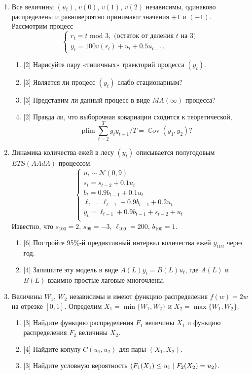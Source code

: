 \documentclass[12pt]{article}
\DeclareMathOperator{\Cov}{\mathbb{C}ov}
\let\P\relax
\DeclareMathOperator{\P}{\mathbb{P}}
\DeclareMathOperator{\plim}{plim}
\newcommand{\cN}{\mathcal{N}}
\begin{document}
\begin{enumerate}
    \item Все величины $(u_t)$, $v(0)$, $v(1)$, $v(2)$ независимы, одинаково распределены и равновероятно принимают значения $+1$ и $(-1)$.
    Рассмотрим процесс 
    \[
    \begin{cases} 
        r_t = t \text{ mod } 3, \text{ (остаток от деления }t \text{ на 3)} \\
        y_t = 100 v(r_t) + u_t + 0.5u_{t-1}.   
    \end{cases}
    \]
    \begin{enumerate}
        \item {[2]} Нарисуйте пару «типичных» траекторий процесса $(y_t)$. 
        \item {[3]} Является ли процесс $(y_t)$ слабо стационарным?
        \item {[3]} Представим ли данный процесс в виде $MA(\infty)$ процесса?
        \item {[2]} Правда ли, что выборочная ковариации сходится к теоретической,
        \[
        \plim \sum_{t=2}^T y_t y_{t-1} / T = \Cov(y_1, y_2)?
        \]
    \end{enumerate}

    \item Динамика количества ежей в лесу $(y_t)$ описывается полугодовым $ETS(AAdA)$ процессом:
    \[
    \begin{cases}
        u_t \sim \cN(0, 9) \\
        s_t = s_{t-2} + 0.1 u_t \\
        b_t = 0.9b_{t-1} + 0.1 u_t \\
        \ell_t = \ell_{t-1} + 0.9b_{t-1} + 0.2 u_t \\
        y_t = \ell_{t-1} + 0.9b_{t-1} + s_{t-2} + u_t \\
    \end{cases}    
    \]
    Известно, что $s_{100} = 2$, $s_{99} = -3$, $\ell_{100} = 200$, $b_{100} = 1$.
    \begin{enumerate}
      \item {[6]} Постройте 95\%-й предиктивный интервал количества ежей $y_{102}$ через год.
      \item {[4]} Запишите эту модель в виде $A(L) y_t = B(L) u_t$, где $A(L)$ и $B(L)$ взаимно-простые лаговые многочлены.
    \end{enumerate}
  
    \item Величины $W_1$, $W_2$ независимы и имеют функцию распределения $f(w) = 2w$ на отрезке $[0, 1]$.
    Определим $X_1 = \min \{W_1, W_2\}$ и $X_2 = \max \{W_1, W_2\}$.
    \begin{enumerate}
        \item {[3]} Найдите функцию распределения $F_1$ величины $X_1$ и функцию распределения $F_2$ величины $X_2$.
        \item {[4]} Найдите копулу $C(u_1, u_2)$ для пары $(X_1, X_2)$.
        \item {[3]} Найдите условную вероятность $\P(F_1(X_1) \leq u_1 \mid F_2(X_2) = u_2)$.
    \end{enumerate}



\end{enumerate}
\end{document}
